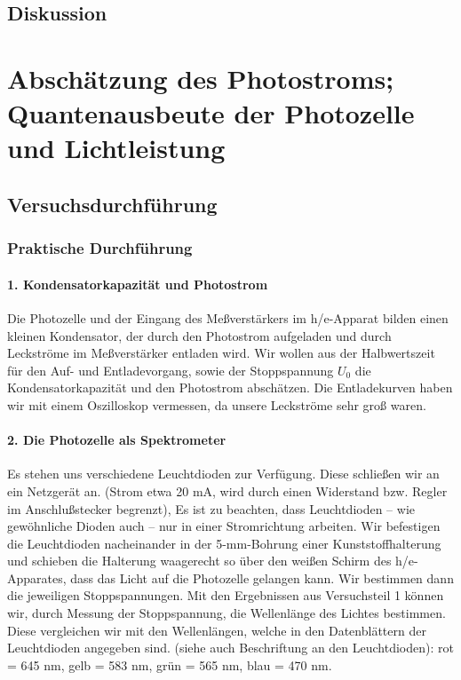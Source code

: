 \documentclass[12pt]{scrartcl}
\begin{document}
\subsection{Diskussion}

\section{Abschätzung des Photostroms; Quantenausbeute der Photozelle und Lichtleistung}
\subsection{Versuchsdurchführung}
\subsubsection{Praktische Durchführung}
\paragraph{1. Kondensatorkapazität und Photostrom}
Die Photozelle und der Eingang des Meßverstärkers im h/e-Apparat bilden einen kleinen Kondensator, der durch den Photostrom aufgeladen und durch Leckströme im Meßverstärker entladen wird.
Wir wollen aus der Halbwertszeit für den Auf- und Entladevorgang, sowie der Stoppspannung $U_0$ die Kondensatorkapazität und den Photostrom abschätzen. Die Entladekurven haben wir mit einem Oszilloskop vermessen, da unsere Leckströme sehr groß waren.

\paragraph{2. Die Photozelle als Spektrometer}
Es stehen uns verschiedene Leuchtdioden zur Verfügung. Diese schließen wir an ein Netzgerät an.
(Strom etwa 20 mA, wird durch einen Widerstand bzw. Regler im Anschlußstecker begrenzt), Es ist zu beachten, dass Leuchtdioden -- wie gewöhnliche Dioden auch -- nur in einer Stromrichtung arbeiten.
Wir befestigen die Leuchtdioden nacheinander in der 5-mm-Bohrung einer Kunststoffhalterung und schieben die Halterung waagerecht so über den weißen Schirm des h/e-Apparates, dass das Licht auf die Photozelle gelangen kann. Wir bestimmen dann die jeweiligen Stoppspannungen.
Mit den Ergebnissen aus Versuchsteil 1 können wir, durch Messung der Stoppspannung, die Wellenlänge des Lichtes bestimmen. Diese vergleichen wir mit den Wellenlängen, welche in den Datenblättern der Leuchtdioden angegeben sind. (siehe auch Beschriftung an den Leuchtdioden):
rot = 645 nm, gelb = 583 nm, grün = 565 nm, blau = 470 nm.
\end{document}
